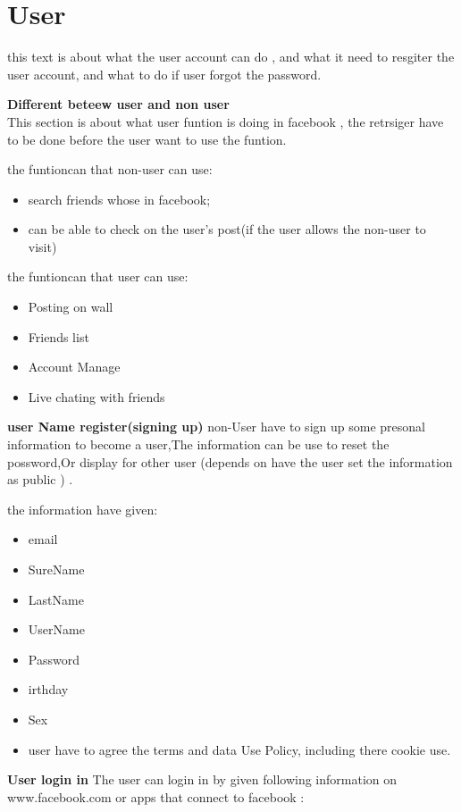 \section{User}
this text is about what the user account can do , and what it need to resgiter
the user account, and what to do if user forgot the password.

\textbf{Different beteew user and non user}\\
This section is about what user funtion is doing in facebook , the retrsiger
have to be done before the user want to use the funtion.

the funtioncan that non-user can use:
\begin{itemize}
\item search friends whose in facebook;
\item can be able to check on the user's post(if the user allows the non-user
      to visit)
\end{itemize}

the funtioncan that user can use:
\begin{itemize}
\item Posting on wall
\item Friends list 
\item Account Manage
\item Live chating with friends
\end{itemize}

\textbf{user Name register(signing up)}
non-User have to sign up some presonal information to become a user,The
information can be use to reset the possword,Or display for other user (depends
on have the user set the information as public ) .

the information have given:
\begin{itemize}
\item email
\item SureName
\item LastName
\item UserName
\item Password
\item irthday
\item Sex
\item user have to agree the terms and data Use Policy, including there cookie
      use.
\end{itemize}

\textbf{User login in}
The user can login in by given following information on www.facebook.com or apps
that connect to facebook : 

